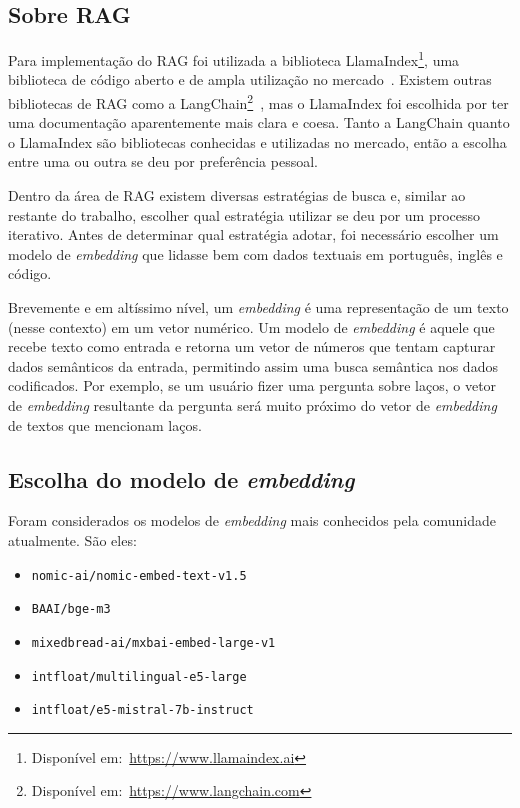 \documentclass[journal]{IEEEtran}
\begin{document}
\subsection{Sobre RAG}

\noindent%
Para implementação do RAG foi utilizada a biblioteca LlamaIndex\footnote{Disponível em:~\url{https://www.llamaindex.ai}}, uma biblioteca de código aberto e de ampla utilização no mercado~\cite{Liu_LlamaIndex_2022}.
Existem outras bibliotecas de RAG como a LangChain\footnote{Disponível em:~\url{https://www.langchain.com}}~\cite{Chase_LangChain_2022}, mas o LlamaIndex foi escolhida por ter uma documentação aparentemente mais clara e coesa.
Tanto a LangChain quanto o LlamaIndex são bibliotecas conhecidas e utilizadas no mercado, então a escolha entre uma ou outra se deu por preferência pessoal.

Dentro da área de RAG existem diversas estratégias de busca e, similar ao restante do trabalho, escolher qual estratégia utilizar se deu por um processo iterativo.
Antes de determinar qual estratégia adotar, foi necessário escolher um modelo de \textit{embedding} que lidasse bem com dados textuais em português, inglês e código.

Brevemente e em altíssimo nível, um \textit{embedding} é uma representação de um texto (nesse contexto) em um vetor numérico.
Um modelo de \textit{embedding} é aquele que recebe texto como entrada e retorna um vetor de números que tentam capturar dados semânticos da entrada, permitindo assim uma busca semântica nos dados codificados.
Por exemplo, se um usuário fizer uma pergunta sobre laços, o vetor de \textit{embedding} resultante da pergunta será muito próximo do vetor de \textit{embedding} de textos que mencionam laços.

\subsection{Escolha do modelo de \textit{embedding}\label{sec:escolha_embedding}}

\noindent%
Foram considerados os modelos de \textit{embedding} mais conhecidos pela comunidade atualmente.
São eles:

\begin{itemize}
    \item \texttt{nomic-ai/nomic-embed-text-v1.5}~\cite{nussbaum2024nomic}
    \item \texttt{BAAI/bge-m3}~\cite{chen2024bge}
    \item \texttt{mixedbread-ai/mxbai-embed-large-v1}~\cite{emb2024mxbai}
    \item \texttt{intfloat/multilingual-e5-large}~\cite{wang2024multilingual}
    \item \texttt{intfloat/e5-mistral-7b-instruct}~\cite{wang2023improving}
\end{itemize}
\end{document}
